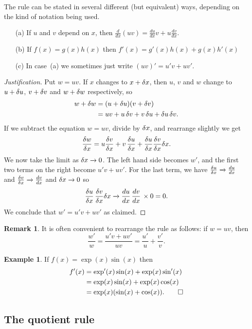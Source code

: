 \documentclass[a4paper]{book}
\theoremstyle{definition}
\newtheorem{remark}[theorem]{Remark}
\newtheorem{example}[theorem]{Example}
\begin{document}
The rule can be stated in several different (but equivalent) ways,
depending on the kind of notation being used.
\begin{itemize}
 \item[(a)] If $u$ and $v$ depend on $x$, then
  $\frac{d}{dx}(uv)=\frac{du}{dx}v+u\frac{dv}{dx}$.
 \item[(b)] If $f(x)=g(x)h(x)$ then $f'(x)=g'(x)h(x)+g(x)h'(x)$
 \item[(c)] In case~(a) we sometimes just write $(uv)'=u'v+uv'$.  
\end{itemize}
\begin{proof}[Justification]
 Put $w=uv$.  If $x$ changes to $x+\delta x$, then $u$, $v$ and $w$
 change to $u+\delta u$, $v+\delta v$ and $w+\delta w$ respectively, so
 \begin{align*}
  w+\delta w &= (u+\delta u)(v+\delta v) \\
          &= uv + u\,\delta v + v\,\delta u + \delta u\,\delta v.
 \end{align*}
 If we subtract the equation $w=uv$, divide by $\delta x$, and rearrange
 slightly we get
 \[ \frac{\delta w}{\delta x} = 
     u\frac{\delta v}{\delta x} + v\,\frac{\delta u}{\delta x} +
     \frac{\delta u}{\delta x}\frac{\delta v}{\delta x}\delta x.
 \]
 We now take the limit as $\delta x\xrightarrow{}0$.  The left hand side becomes
 $w'$, and the first two terms on the right become $u'v+uv'$.   For
 the last term, we have $\frac{\delta u}{\delta x}\xrightarrow{}\frac{du}{dx}$ and 
 $\frac{\delta v}{\delta x}\xrightarrow{}\frac{dv}{dx}$ and $\delta x\xrightarrow{}0$ so 
 \[ \frac{\delta u}{\delta x}\,\frac{\delta v}{\delta x}\delta x \xrightarrow{}
     \frac{du}{dx}\,\frac{dv}{dx}\,\times 0 = 0.
 \]
 We conclude that $w'=u'v+uv'$ as claimed.
\end{proof}
\begin{remark}
 It is often convenient to rearrange the rule as follows: if $w=uv$,
 then 
 \[ \frac{w'}{w} = \frac{u'v+uv'}{uv} =
     \frac{u'}{u} + \frac{v'}{v}.
 \]  
\end{remark}
\begin{example}
 If $f(x)=\exp(x)\sin(x)$ then
 \begin{align*}
  f'(x) &= \exp'(x)\sin(x) + \exp(x)\sin'(x) \\
        &= \exp(x)\sin(x) + \exp(x)\cos(x) \\
        &= \exp(x)(\sin(x)+\cos(x)). \qed
 \end{align*}
\end{example}

\subsection{The quotient rule}
\label{subsec-rule-quot}
\end{document}
